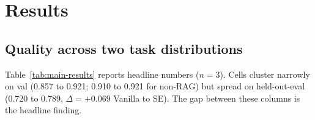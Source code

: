 \documentclass{article}
\begin{document}
\section{Results}
\label{sec:results}

\subsection{Quality across two task distributions}
\label{subsec:quality}

Table~\ref{tab:main-results} reports headline numbers ($n=3$). Cells cluster narrowly on val (0.857 to 0.921; 0.910 to 0.921 for non-RAG) but spread on held-out-eval (0.720 to 0.789, $\Delta = +0.069$ Vanilla to SE). The gap between these columns is the headline finding.
\end{document}
